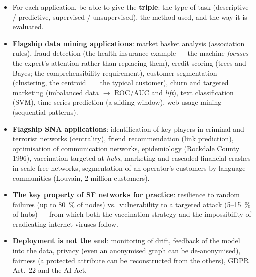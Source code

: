 \documentclass[11pt,a4paper]{article}
\theoremstyle{definition}
\begin{document}
\begin{itemize}
\item For each application, be able to give the \textbf{triple}: the type of task (descriptive /
      predictive, supervised / unsupervised), the method used, and the way it is evaluated.
\item \textbf{Flagship data mining applications}: market basket analysis (association rules),
      fraud detection (the health insurance example --- the machine \emph{focuses} the expert's
      attention rather than replacing them), credit scoring (trees and Bayes; the comprehensibility
      requirement), customer segmentation (clustering, the centroid $=$ the typical customer), churn
      and targeted marketing (imbalanced data $\to$ ROC/AUC and \emph{lift}), text classification
      (SVM), time series prediction (a sliding window), web usage mining (sequential patterns).
\item \textbf{Flagship SNA applications}: identification of key players in criminal and terrorist
      networks (centrality), friend recommendation (link prediction), optimisation of communication
      networks, epidemiology (Rockdale County 1996), vaccination targeted at \emph{hubs}, marketing
      and cascaded financial crashes in scale-free networks, segmentation of an operator's customers by
      language communities (Louvain, 2 million customers).
\item \textbf{The key property of SF networks for practice}: resilience to random failures (up to
      80~\% of nodes) vs.\ vulnerability to a targeted attack (5--15~\% of hubs) --- from which both
      the vaccination strategy and the impossibility of eradicating internet viruses follow.
\item \textbf{Deployment is not the end}: monitoring of drift, feedback of the model into the data,
      privacy (even an anonymised graph can be de-anonymised), fairness (a protected attribute can be
      reconstructed from the others), GDPR Art.~22 and the AI Act.
\end{itemize}
\end{document}
